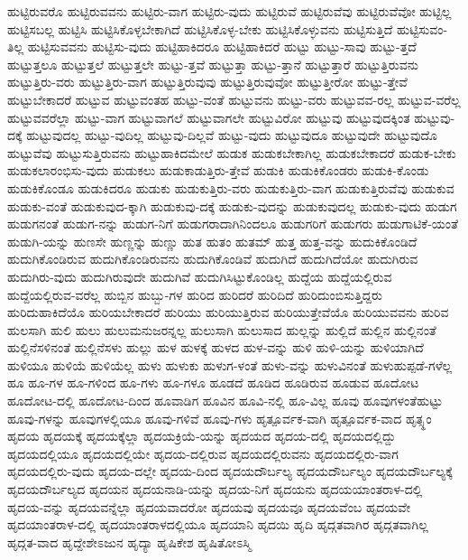 {ಹುಟ್ಟಿರುವರೊ
ಹುಟ್ಟಿರುವವನು
ಹುಟ್ಟಿರು-ವಾಗ
ಹುಟ್ಟಿರು-ವುದು
ಹುಟ್ಟಿರುವೆ
ಹುಟ್ಟಿರುವೆವು
ಹುಟ್ಟಿರುವೆವೋ
ಹುಟ್ಟಿಲ್ಲ
ಹುಟ್ಟಿಸಬಲ್ಲ
ಹುಟ್ಟಿಸಿ
ಹುಟ್ಟಿಸಿಕೊಳ್ಳಬೇಕಾಗಿದೆ
ಹುಟ್ಟಿಸಿಕೊಳ್ಳ-ಬೇಕು
ಹುಟ್ಟಿಸಿಕೊಳ್ಳುವನು
ಹುಟ್ಟಿಸುತ್ತಿದೆ
ಹುಟ್ಟಿಸುವಂ-ತಿಲ್ಲ
ಹುಟ್ಟಿಸುವವನು
ಹುಟ್ಟಿಸು-ವುದು
ಹುಟ್ಟಿಹಾಕಿದರೂ
ಹುಟ್ಟಿಹಾಕಿದರೆ
ಹುಟ್ಟು
ಹುಟ್ಟು-ಸಾವು
ಹುಟ್ಟು-ತ್ತದೆ
ಹುಟ್ಟುತ್ತಲೂ
ಹುಟ್ಟುತ್ತಲೆ
ಹುಟ್ಟುತ್ತಲೇ
ಹುಟ್ಟು-ತ್ತವೆ
ಹುಟ್ಟುತ್ತಾ
ಹುಟ್ಟು-ತ್ತಾನೆ
ಹುಟ್ಟುತ್ತಾರೆ
ಹುಟ್ಟುತ್ತಿರುವನು
ಹುಟ್ಟುತ್ತಿರು-ವರು
ಹುಟ್ಟುತ್ತಿರು-ವಾಗ
ಹುಟ್ಟುತ್ತಿರುವುವು
ಹುಟ್ಟುತ್ತಿರುವುವೋ
ಹುಟ್ಟುತ್ತೀರೋ
ಹುಟ್ಟು-ತ್ತೇವೆ
ಹುಟ್ಟುಬೇಕಾದರೆ
ಹುಟ್ಟುವ
ಹುಟ್ಟುವಂತಹ
ಹುಟ್ಟು-ವಂತೆ
ಹುಟ್ಟುವನು
ಹುಟ್ಟು-ವರು
ಹುಟ್ಟುವವ-ರಲ್ಲ
ಹುಟ್ಟುವ-ವರೆಲ್ಲ
ಹುಟ್ಟುವವರೆಲ್ಲಾ
ಹುಟ್ಟು-ವಾಗ
ಹುಟ್ಟುವಾಗಲೆ
ಹುಟ್ಟುವಾಗಲೇ
ಹುಟ್ಟುವಿರೋ
ಹುಟ್ಟುವು
ಹುಟ್ಟುವುದಕ್ಕಿಂತ
ಹುಟ್ಟುವು-ದಕ್ಕೆ
ಹುಟ್ಟುವುದಲ್ಲ
ಹುಟ್ಟು-ವುದಿಲ್ಲ
ಹುಟ್ಟುವು-ದಿಲ್ಲವೆ
ಹುಟ್ಟು-ವುದು
ಹುಟ್ಟುವುದೂ
ಹುಟ್ಟುವುದೇ
ಹುಟ್ಟುವುದೊ
ಹುಟ್ಟುವೆವು
ಹುಟ್ಟುಸುತ್ತಿರುವನು
ಹುಟ್ಟುಹಾಕಿದಮೇಲೆ
ಹುಡುಕ
ಹುಡುಕಬೇಕಾಗಿಲ್ಲ
ಹುಡುಕಬೇಕಾದರೆ
ಹುಡುಕ-ಬೇಕು
ಹುಡುಕಲಾರಂಭಿಸು-ವುದು
ಹುಡುಕಲು
ಹುಡುಕಾಡುತ್ತಿರು-ತ್ತೇವೆ
ಹುಡುಕಿ
ಹುಡುಕಿಕೊಂಡರು
ಹುಡುಕಿ-ಕೊಂಡು
ಹುಡುಕಿಕೊಂಡೂ
ಹುಡುಕಿದರೂ
ಹುಡುಕು
ಹುಡುಕುತ್ತಿರು-ವರು
ಹುಡುಕುತ್ತಿರು-ವಾಗ
ಹುಡುಕುತ್ತಿರುವೆವು
ಹುಡುಕುವ
ಹುಡುಕು-ವಂತೆ
ಹುಡುಕುವುದ-ಕ್ಕಾಗಿ
ಹುಡುಕುವು-ದಕ್ಕೆ
ಹುಡುಕು-ವುದನ್ನು
ಹುಡುಕುವುದಲ್ಲ
ಹುಡುಕು-ವುದು
ಹುಡುಗ
ಹುಡುಗನಂತೆ
ಹುಡುಗ-ನನ್ನು
ಹುಡುಗ-ನಿಗೆ
ಹುಡುಗರಾದಾಗಿನಿಂದಲೂ
ಹುಡುಗರಿಗೆ
ಹುಡುಗರು
ಹುಡುಗಾಟಿಕೆ-ಯಂತೆ
ಹುಡುಗಿ-ಯನ್ನು
ಹುಣಸೇ
ಹುಣ್ಣನ್ನು
ಹುಣ್ಣು
ಹುತ
ಹುತಂ
ಹುತಮ್
ಹುತ್ತ
ಹುತ್ತ-ವನ್ನು
ಹುದುಕಿಕೊಂಡಿದೆ
ಹುದುಗಿಕೊಂಡಿರುವ
ಹುದುಗಿಕೊಂಡಿರುವನು
ಹುದುಗಿಕೊಂಡಿವೆ
ಹುದುಗಿದೆ
ಹುದುಗಿದೆಯೋ
ಹುದುಗಿರುವ
ಹುದುಗಿರು-ವುದು
ಹುದುಗಿರುವುದೇ
ಹುದುಗಿವೆ
ಹುದುಗಿಸಿಟ್ಟುಕೊಂಡಿಲ್ಲ
ಹುದ್ದೆಯ
ಹುದ್ದೆಯಲ್ಲಿರುವ
ಹುದ್ದೆಯಲ್ಲಿರುವ-ವರೆಲ್ಲ
ಹುಬ್ಬಿನ
ಹುಬ್ಬು-ಗಳ
ಹುರಿದ
ಹುರಿದರೆ
ಹುರಿದಿದೆ
ಹುರಿದುಂಬಿಸುತ್ತಿದ್ದರು
ಹುರಿದುಹಾಕಿದೆಯೊ
ಹುರಿಯಬೇಕಾದರೆ
ಹುರಿಯು
ಹುರಿಯುತ್ತಿರುವ
ಹುರಿಯುತ್ತೇವೆಯೊ
ಹುರಿಯುವವನು
ಹುರಿವ
ಹುಲಸಾಗಿ
ಹುಲಿ
ಹುಲು
ಹುಲುಮನುಜರನ್ನಲ್ಲ
ಹುಲುಸಾಗಿ
ಹುಲುಸಾದ
ಹುಲ್ಲನ್ನು
ಹುಲ್ಲಿದೆ
ಹುಲ್ಲಿನ
ಹುಲ್ಲಿನಂತೆ
ಹುಲ್ಲಿನೆಸಳಿನಂತೆ
ಹುಲ್ಲಿನೆಸಳು
ಹುಲ್ಲು
ಹುಳ
ಹುಳಕ್ಕೆ
ಹುಳದ
ಹುಳ-ವನ್ನು
ಹುಳಿ
ಹುಳಿ-ಯನ್ನು
ಹುಳಿಯಾಗಿದೆ
ಹುಳಿಯೂ
ಹುಳಿಯೆ
ಹುಳಿಯೆಲ್ಲ
ಹುಳು
ಹುಳುಕು
ಹುಳುಗ-ಳಂತೆ
ಹುಳು-ವನ್ನು
ಹುಳುವಿನಂತೆ
ಹುಳುಹುಪ್ಪಡೆ-ಗಳೆಲ್ಲ
ಹೂ
ಹೂ-ಗಳ
ಹೂ-ಗಳಿಂದ
ಹೂ-ಗಳು
ಹೂ-ಗಳೂ
ಹೂಡದೆ
ಹೂಡಿದ
ಹೂಡಿರುವ
ಹೂಡುವ
ಹೂದೋಟ
ಹೂದೋಟ-ದಲ್ಲಿ
ಹೂದೋಟ-ದಿಂದ
ಹೂವಾಡಿಗ
ಹೂವಿನ
ಹೂವಿ-ನಲ್ಲಿ
ಹೂ-ವಿಲ್ಲ
ಹೂವು
ಹೂವುಗಳಂತೆಹುಟ್ಟು
ಹೂವು-ಗಳನ್ನು
ಹೂವುಗಳಲ್ಲಿಯೂ
ಹೂವು-ಗಳಿವೆ
ಹೂವು-ಗಳು
ಹೃತ್ಪೂರ್ವಕ-ವಾಗಿ
ಹೃತ್ಪೂರ್ವಕ-ವಾದ
ಹೃತ್ಸ್ಥಂ
ಹೃದಯ
ಹೃದಯಕ್ಕೆ
ಹೃದಯಕ್ಕೆಲ್ಲಾ
ಹೃದಯಕ್ರಿಯೆ-ಯನ್ನು
ಹೃದಯದ
ಹೃದಯ-ದಲ್ಲಿ
ಹೃದಯದಲ್ಲಿದ್ದು
ಹೃದಯದಲ್ಲಿಯೂ
ಹೃದಯದಲ್ಲಿಯೇ
ಹೃದಯ-ದಲ್ಲಿರುವ
ಹೃದಯದಲ್ಲಿರುವನು
ಹೃದಯದಲ್ಲಿರು-ವಾಗ
ಹೃದಯದಲ್ಲಿರು-ವುದು
ಹೃದಯ-ದಲ್ಲೇ
ಹೃದಯ-ದಿಂದ
ಹೃದಯದೌರ್ಬಲ್ಯ
ಹೃದಯದೌರ್ಬಲ್ಯಂ
ಹೃದಯದೌರ್ಬಲ್ಯಕ್ಕೆ
ಹೃದಯದೌರ್ಬಲ್ಯದ
ಹೃದಯನ
ಹೃದಯನಾಡಿ-ಯನ್ನು
ಹೃದಯ-ನಿಗೆ
ಹೃದಯನು
ಹೃದಯಯಾಂತರಾಳ-ದಲ್ಲಿ
ಹೃದಯ-ವನ್ನು
ಹೃದಯವನ್ನೆಲ್ಲಾ
ಹೃದಯವಾದರೋ
ಹೃದಯವು
ಹೃದಯವೂ
ಹೃದಯವೆಂಬ
ಹೃದಯವೇ
ಹೃದಯಾಂತರಾಳ-ದಲ್ಲಿ
ಹೃದಯಾಂತರಾಳದಲ್ಲಿಯೂ
ಹೃದಯಾನಿ
ಹೃದಯಿ
ಹೃದಿ
ಹೃದ್ಗತವಾಗಿರ
ಹೃದ್ಗತವಾಗಿಲ್ಲ
ಹೃದ್ಗತ-ವಾದ
ಹೃದ್ದೇಶೇಽಜುನ
ಹೃದ್ಯಾ
ಹೃಷಿಕೇಶ
ಹೃಷಿತೋಽಸ್ಮಿ
}
